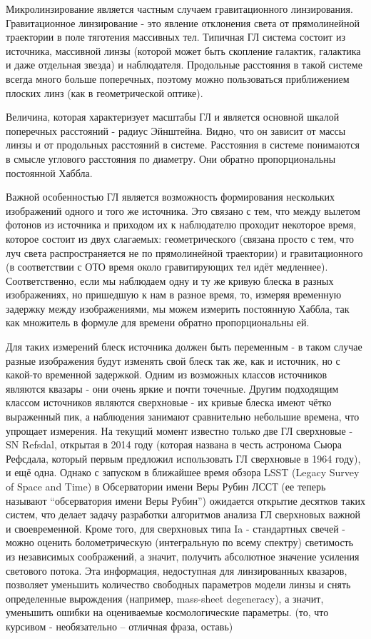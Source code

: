 Микролинзирование является частным случаем гравитационного линзирования. Гравитационное линзирование - это явление отклонения света от прямолинейной траектории в поле тяготения массивных тел. Типичная ГЛ система состоит из источника, массивной линзы (которой может быть скопление галактик, галактика и даже отдельная звезда) и наблюдателя. Продольные расстояния в такой системе всегда много больше поперечных, поэтому можно пользоваться приближением плоских линз (как в геометрической оптике). 

Величина, которая характеризует масштабы ГЛ и является основной шкалой поперечных расстояний - радиус Эйнштейна. Видно, что он зависит от массы линзы и от продольных расстояний в системе. Расстояния в системе понимаются в смысле углового расстояния по диаметру. Они обратно пропорциональны постоянной Хаббла.

Важной особенностью ГЛ является возможность формирования нескольких изображений одного и того же источника. Это связано с тем, что между вылетом фотонов из источника и приходом их к наблюдателю проходит некоторое время, которое состоит из двух слагаемых: геометрического (связана просто с тем, что луч света распространяется не по прямолинейной траектории) и гравитационного (в соответствии с ОТО время около гравитирующих тел идёт медленнее). Соответственно, если мы наблюдаем одну и ту же кривую блеска в разных изображениях, но пришедшую к нам в разное время, то, измеряя временную задержку между изображениями, мы можем измерить постоянную Хаббла, так как множитель в формуле для времени обратно пропорциональны ей.

Для таких измерений блеск источника должен быть переменным - в таком случае разные изображения будут изменять свой блеск так же, как и источник, но с какой-то временной задержкой. Одним из возможных классов источников являются квазары - они очень яркие и почти точечные. Другим подходящим классом источников являются сверхновые - их кривые блеска имеют чётко выраженный пик, а наблюдения занимают сравнительно небольшие времена, что упрощает измерения. На текущий момент известно только две ГЛ сверхновые - SN Refsdal, открытая в 2014 году (которая названа в честь астронома Сьюра Рефсдала, который первым предложил использовать ГЛ сверхновые в 1964 году), и ещё одна. Однако с запуском в ближайшее время  обзора LSST (Legacy Survey of Space and Time) в Обсерватории имени Веры Рубин  ЛССТ (ее теперь называют “обсерватория имени Веры Рубин”) ожидается открытие десятков таких систем, что делает задачу разработки алгоритмов анализа ГЛ сверхновых важной и своевременной.
Кроме того, для сверхновых типа Ia - стандартных свечей - можно оценить болометрическую (интегральную по всему спектру) светимость из независимых соображений, а значит, получить абсолютное значение усиления светового потока. Эта информация, недоступная для линзированных квазаров, позволяет уменьшить количество свободных параметров модели линзы и снять определенные вырождения (например, mass-sheet degeneracy), а значит, уменьшить ошибки на  оцениваемые космологические параметры.  (то, что курсивом - необязательно -- отличная фраза, оставь)

